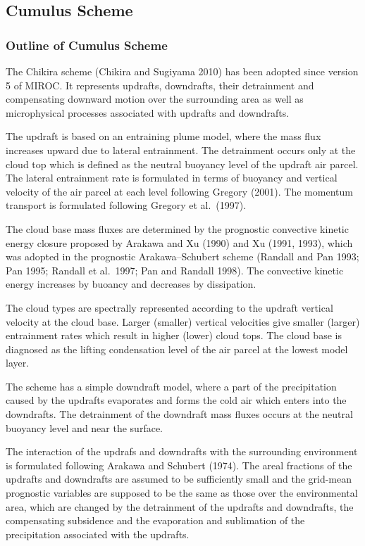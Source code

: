 \hypertarget{cumulus-scheme}{%
\subsection{Cumulus Scheme}\label{cumulus-scheme}}

\hypertarget{outline-of-cumulus-scheme}{%
\subsubsection{Outline of Cumulus
Scheme}\label{outline-of-cumulus-scheme}}

The Chikira scheme (Chikira and Sugiyama 2010) has been adopted since
version 5 of MIROC. It represents updrafts, downdrafts, their
detrainment and compensating downward motion over the surrounding area
as well as microphysical processes associated with updrafts and
downdrafts.

The updraft is based on an entraining plume model, where the mass flux
increases upward due to lateral entrainment. The detrainment occurs only
at the cloud top which is defined as the neutral buoyancy level of the
updraft air parcel. The lateral entrainment rate is formulated in terms
of buoyancy and vertical velocity of the air parcel at each level
following Gregory (2001). The momentum transport is formulated following
Gregory et al.~(1997).

The cloud base mass fluxes are determined by the prognostic convective
kinetic energy closure proposed by Arakawa and Xu (1990) and Xu (1991,
1993), which was adopted in the prognostic Arakawa--Schubert scheme
(Randall and Pan 1993; Pan 1995; Randall et al.~1997; Pan and Randall
1998). The convective kinetic energy increases by buoancy and decreases
by dissipation.

The cloud types are spectrally represented according to the updraft
vertical velocity at the cloud base. Larger (smaller) vertical
velocities give smaller (larger) entrainment rates which result in
higher (lower) cloud tops. The cloud base is diagnosed as the lifting
condensation level of the air parcel at the lowest model layer.

The scheme has a simple downdraft model, where a part of the
precipitation caused by the updrafts evaporates and forms the cold air
which enters into the downdrafts. The detrainment of the downdraft mass
fluxes occurs at the neutral buoyancy level and near the surface.

The interaction of the updrafs and downdrafts with the surrounding
environment is formulated following Arakawa and Schubert (1974). The
areal fractions of the updrafts and downdrafts are assumed to be
sufficiently small and the grid-mean prognostic variables are supposed
to be the same as those over the environmental area, which are changed
by the detrainment of the updrafts and downdrafts, the compensating
subsidence and the evaporation and sublimation of the precipitation
associated with the updrafts.

